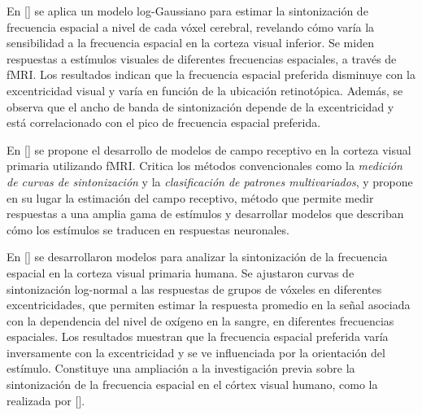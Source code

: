 En [\cite{aghajari_population_2020}] se aplica un modelo log-Gaussiano para estimar la sintonización de frecuencia espacial a nivel de cada vóxel cerebral, revelando cómo varía la sensibilidad a la frecuencia espacial en la corteza visual inferior. Se miden respuestas a estímulos visuales de diferentes frecuencias espaciales, a trav\'es de fMRI. Los resultados indican que la frecuencia espacial preferida disminuye con la excentricidad visual y varía en función de la ubicación retinotópica. Además, se observa que el ancho de banda de sintonización depende de la excentricidad y está correlacionado con el pico de frecuencia espacial preferida.

En [\cite{kriegeskorte_understanding_2011}] se propone el desarrollo de modelos de campo receptivo en la corteza visual primaria utilizando fMRI. Critica los métodos convencionales como la \textit{medición de curvas de sintonización} y la \textit{clasificación de patrones multivariados}, y propone en su lugar la estimación del campo receptivo, método que permite medir respuestas a una amplia gama de estímulos y desarrollar modelos que describan cómo los estímulos se traducen en respuestas neuronales.

En [\cite{broderick_mapping_2022}] se desarrollaron modelos para analizar la sintonización de la frecuencia espacial en la corteza visual primaria humana. Se ajustaron curvas de sintonización log-normal a las respuestas de grupos de vóxeles en diferentes excentricidades, que permiten estimar la respuesta promedio en la señal asociada con la dependencia del nivel de oxígeno en la sangre, en diferentes frecuencias espaciales. Los resultados muestran que la frecuencia espacial preferida varía inversamente con la excentricidad y se ve influenciada por la orientación del estímulo. Constituye una ampliaci\'on a la investigación previa sobre la sintonización de la frecuencia espacial en el córtex visual humano, como la realizada por [\cite{aghajari_population_2020}]. 






